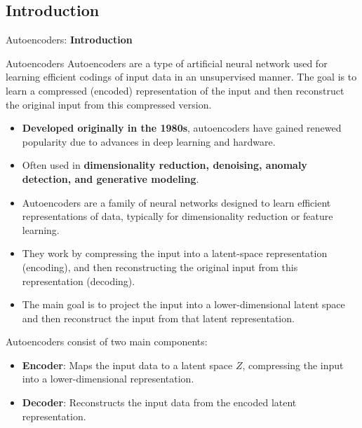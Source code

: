 \subsection{Introduction}
\begin{frame}{}
    \LARGE Autoencoders: \textbf{Introduction}
\end{frame}

\begin{frame}[allowframebreaks]{Autoencoders}
Autoencoders are a type of artificial neural network used for learning efficient codings of input data in an unsupervised manner. The goal is to learn a compressed (encoded) representation of the input and then reconstruct the original input from this compressed version.
\begin{itemize}
    \item \textbf{Developed originally in the 1980s}, autoencoders have gained renewed popularity due to advances in deep learning and hardware.
    \item Often used in \textbf{dimensionality reduction, denoising, anomaly detection, and generative modeling}.
\end{itemize}

\framebreak

\begin{itemize}
    \item Autoencoders are a family of neural networks designed to learn efficient representations of data, typically for dimensionality reduction or feature learning.
    \item They work by compressing the input into a latent-space representation (encoding), and then reconstructing the original input from this representation (decoding).
    \item The main goal is to project the input into a lower-dimensional latent space and then reconstruct the input from that latent representation.
\end{itemize}

\framebreak
    
Autoencoders consist of two main components:
\begin{itemize}
    \item \textbf{Encoder}: Maps the input data to a latent space $Z$, compressing the input into a lower-dimensional representation.
    \item \textbf{Decoder}: Reconstructs the input data from the encoded latent representation.
\end{itemize}


\end{frame}
